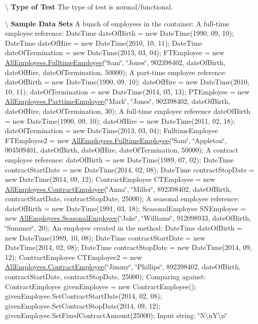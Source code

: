 \textbackslash{} {\bfseries  Type of Test} The type of test is normal/functional.

\textbackslash{} {\bfseries  Sample Data Sets} A bunch of employees in the container\+: A full-\/time employee reference\+: Date\+Time date\+Of\+Birth = new Date\+Time(1990, 09, 10); Date\+Time date\+Of\+Hire = new Date\+Time(2010, 10, 11); Date\+Time date\+Of\+Termination = new Date\+Time(2013, 03, 04); F\+T\+Employee = new \hyperlink{class_all_employees_1_1_fulltime_employee}{All\+Employees.\+Fulltime\+Employee}(\char`\"{}\+Sam\char`\"{}, \char`\"{}\+Jones\char`\"{}, 902398402, date\+Of\+Birth, date\+Of\+Hire, date\+Of\+Termination, 50000); A part-\/time employee reference\+: date\+Of\+Birth = new Date\+Time(1990, 09, 10); date\+Of\+Hire = new Date\+Time(2010, 10, 11); date\+Of\+Termination = new Date\+Time(2014, 05, 13); P\+T\+Employee = new \hyperlink{class_all_employees_1_1_parttime_employee}{All\+Employees.\+Parttime\+Employee}(\char`\"{}\+Mark\char`\"{}, \char`\"{}\+Jones\char`\"{}, 902398402, date\+Of\+Birth, date\+Of\+Hire, date\+Of\+Termination, 30); A full-\/time employee reference date\+Of\+Birth = new Date\+Time(1990, 09, 10); date\+Of\+Hire = new Date\+Time(2011, 02, 18); date\+Of\+Termination = new Date\+Time(2013, 03, 04); Fulltime\+Employee F\+T\+Employee2 = new \hyperlink{class_all_employees_1_1_fulltime_employee}{All\+Employees.\+Fulltime\+Employee}(\char`\"{}\+Sam\char`\"{}, \char`\"{}\+Appleton\char`\"{}, 904509401, date\+Of\+Birth, date\+Of\+Hire, date\+Of\+Termination, 50000); A contract employee reference\+: date\+Of\+Birth = new Date\+Time(1989, 07, 02); Date\+Time contract\+Start\+Date = new Date\+Time(2014, 02, 08); Date\+Time contract\+Stop\+Date = new Date\+Time(2014, 09, 12); Contract\+Employee C\+T\+Employee = new \hyperlink{class_all_employees_1_1_contract_employee}{All\+Employees.\+Contract\+Employee}(\char`\"{}\+Anna\char`\"{}, \char`\"{}\+Miller\char`\"{}, 892398402, date\+Of\+Birth, contract\+Start\+Date, contract\+Stop\+Date, 25000); A seasonal employee reference\+: date\+Of\+Birth = new Date\+Time(1991, 03, 18); Seasonal\+Employee S\+N\+Employee = new \hyperlink{class_all_employees_1_1_seasonal_employee}{All\+Employees.\+Seasonal\+Employee}(\char`\"{}\+Jake\char`\"{}, \char`\"{}\+Williams\char`\"{}, 912098933, date\+Of\+Birth, \char`\"{}\+Summer\char`\"{}, 20); An employee created in the method\+: Date\+Time date\+Of\+Birth = new Date\+Time(1989, 10, 08); Date\+Time contract\+Start\+Date = new Date\+Time(2014, 02, 08); Date\+Time contract\+Stop\+Date = new Date\+Time(2014, 09, 12); Contract\+Employee C\+T\+Employee2 = new \hyperlink{class_all_employees_1_1_contract_employee}{All\+Employees.\+Contract\+Employee}(\char`\"{}\+Jimmy\char`\"{}, \char`\"{}\+Phillips\char`\"{}, 892398402, date\+Of\+Birth, contract\+Start\+Date, contract\+Stop\+Date, 25000); Comparing against\+: Contract\+Employee given\+Employee = new Contract\+Employee(); given\+Employee.\+Set\+Contract\+Start\+Date(2014, 02, 08); given\+Employee.\+Set\+Contract\+Stop\+Date(2014, 09, 12); given\+Employee.\+Set\+Fixed\+Contract\+Amount(25000); Input string\+: \char`\"{}\+N\textbackslash{}n\+Y\textbackslash{}n\char`\"{}


